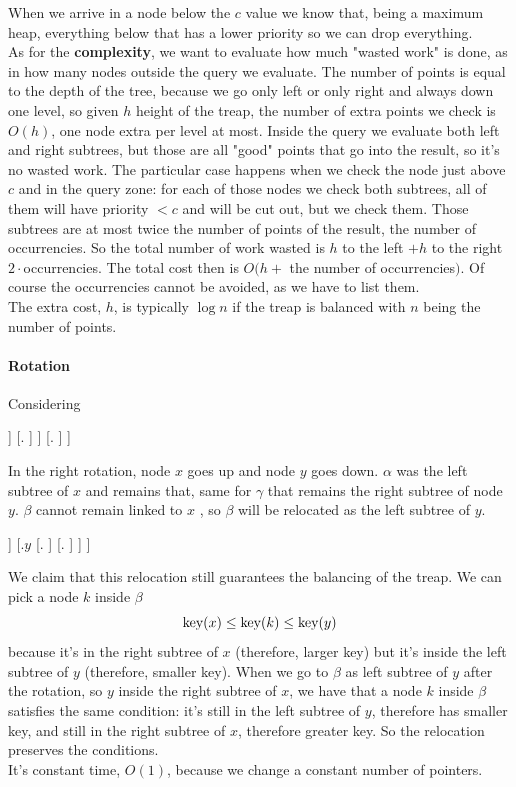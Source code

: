 \documentclass[10pt]{report}
\newcommand*\triangled[1]{\tikz[baseline=(char.base)]{
            \node[regular polygon, regular polygon sides=3,draw,inner sep=1pt] (char) {#1};}}
\begin{document}
When we arrive in a node below the $c$ value we know that, being a maximum heap, everything below that has a lower priority so we can drop everything.\\
As for the \textbf{complexity}, we want to evaluate how much "wasted work" is done, as in how many nodes outside the query we evaluate. The number of points is equal to the depth of the tree, because we go only left or only right and always down one level, so given $h$ height of the treap, the number of extra points we check is $O(h)$, one node extra per level at most. Inside the query we evaluate both left and right subtrees, but those are all "good" points that go into the result, so it's no wasted work. The particular case happens when we check the node just above $c$ and in the query zone: for each of those nodes we check both subtrees, all of them will have priority $< c$ and will be cut out, but we check them. Those subtrees are at most twice the number of points of the result, the number of occurrencies. So the total number of work wasted is $h$ to the left $+ h$ to the right $2\cdot$occurrencies. The total cost then is $O(h +$ the number of occurrencies$)$. Of course the occurrencies cannot be avoided, as we have to list them.\\
The extra cost, $h$, is typically $\log n$ if the treap is balanced with $n$ being the number of points.
\paragraph{Rotation} Considering 
\begin{center}
\Tree [.$y$ [.$x$ [.\triangled{$\alpha$} ] [.\triangled{$\beta$} ] ] [.\triangled{$\gamma$} ] ]
\end{center}
In the right rotation, node $x$ goes up and node $y$ goes down. $\alpha$ was the left subtree of $x$ and remains that, same for $\gamma$ that remains the right subtree of node $y$. $\beta$ cannot remain linked to $x$ , so $\beta$ will be relocated as the left subtree of $y$.
\begin{center}
\Tree [.$x$ [.\triangled{$\alpha$} ] [.$y$ [.\triangled{$\beta$} ] [.\triangled{$\gamma$} ] ] ]
\end{center}
We claim that this relocation still guarantees the balancing of the treap. We can pick a node $k$ inside $\beta$
$$\hbox{key}(x) \leq \hbox{key}(k) \leq \hbox{key}(y)$$
because it's in the right subtree of $x$ (therefore, larger key) but it's inside the left subtree of $y$ (therefore, smaller key). When we go to $\beta$ as left subtree of $y$ after the rotation, so $y$ inside the right subtree of $x$, we have that a node $k$ inside $\beta$ satisfies the same condition: it's still in the left subtree of $y$, therefore has smaller key, and still in the right subtree of $x$, therefore greater key. So the relocation preserves the conditions.\\
It's constant time, $O(1)$, because we change a constant number of pointers.
\end{document}
